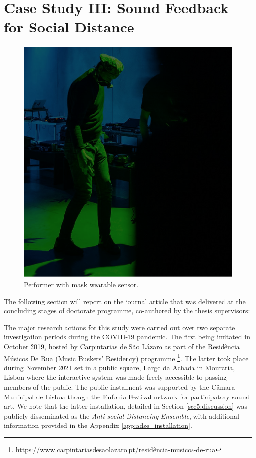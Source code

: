 \chapter{Case Study III: Sound Feedback for Social Distance}
\label{case_studies:adse_ess}

\begin{figure}[!h]
\captionsetup{width=1.0\textwidth}
\centering
\includegraphics[width=0.6
\textwidth,keepaspectratio]{Chapters/Figures/adse_ess/CSL_MASK_MICK.png}
{\caption{Performer with mask wearable sensor.
}\label{fig:sensor_model}}
\end{figure}

The following section will report on the journal article that was delivered at the concluding stages of doctorate programme, co-authored by the thesis supervisors:


The major research actions for this study were carried out over two separate investigation periods during the COVID-19 pandemic. The first being imitated in October 2019, hosted by Carpintarias de São Lázaro as part of the Residência Músicos De Rua (Music Buskers' Residency) programme \footnote{\url{https://www.carpintariasdesaolazaro.pt/residência-musicos-de-rua}}. The latter took place during November 2021 set in a public square, Largo da Achada in Mouraria, Lisbon where the interactive system was made freely accessible to passing members of the public. The public instalment was supported by the Câmara Municipal de Lisboa though the Eufonia Festival network for participatory sound art. We note that the latter installation, detailed in Section \ref{sec5:discussion} was publicly disseminated as the \textit{Anti-social Distancing Ensemble}, with additional information provided in the Appendix \ref{app:adse_installation}.

